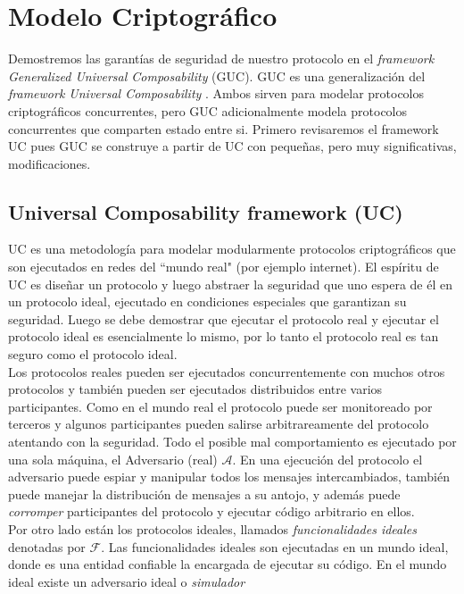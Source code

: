 \chapter{Modelo Criptográfico}

Demostremos las garantías de seguridad de nuestro protocolo en el
\textit{framework Generalized Universal Composability} (GUC). GUC \cite{conf/tcc/CanettiDPW07}
es una generalización del \textit{framework Universal Composability}
\cite{conf/focs/Canetti01}. Ambos sirven para modelar protocolos criptográficos concurrentes,
pero GUC adicionalmente modela protocolos concurrentes que comparten estado entre si.
Primero revisaremos el framework UC pues GUC se construye a partir de UC con pequeñas,
pero muy significativas, modificaciones.\\

\section{Universal Composability framework (UC)}
\label{sect:uc}
UC es una metodología para modelar modularmente protocolos criptográficos que son ejecutados en redes
del ``mundo real" (por ejemplo internet). El espíritu de UC es diseñar un protocolo y luego abstraer la
seguridad que uno espera de él en un protocolo ideal, ejecutado en condiciones especiales que garantizan
su seguridad. Luego se debe demostrar que ejecutar el protocolo real y ejecutar el protocolo ideal es
esencialmente lo mismo, por lo tanto el protocolo real es tan seguro como el protocolo ideal.\\
Los protocolos reales pueden ser ejecutados concurrentemente con muchos otros protocolos
y también pueden ser ejecutados distribuidos entre varios participantes.
Como en el mundo real el protocolo puede ser monitoreado por terceros y algunos participantes pueden salirse
arbitrareamente del protocolo atentando con la seguridad. Todo el posible mal comportamiento es ejecutado por una sola
máquina, el Adversario (real) $\mathcal{A}$. En una ejecución del protocolo el adversario puede espiar y
manipular todos los mensajes intercambiados, también puede manejar la distribución de mensajes a su antojo,
y además puede \textit{corromper} participantes del protocolo y ejecutar código arbitrario en ellos.\\
Por otro lado están los protocolos ideales, llamados \textit{funcionalidades ideales} denotadas por 
$\mathcal{F}$. Las funcionalidades ideales son ejecutadas en un mundo ideal, donde es una entidad confiable
la encargada de ejecutar su código. En el mundo ideal existe un adversario ideal o \textit{simulador}
